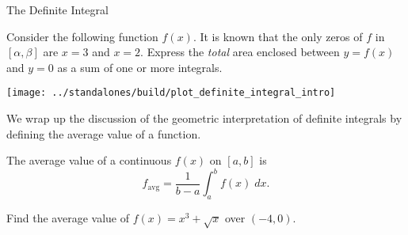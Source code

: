 \documentclass[../main.tex]{subfiles}
\begin{document}
\begin{lesson}{The Definite Integral}
  \begin{example}
    Consider the following function \(f(x)\).  It is known that the only zeros of \(f\) in \([\alpha, \beta]\) are \(x = 3\) and \(x = 2\). Express the \emph{total} area enclosed between \(y = f(x)\) and \(y = 0\) as a sum of one or more integrals.

    \texttt{[image: ../standalones/build/plot\_definite\_integral\_intro]}

  \end{example}
  \clearpage


  We wrap up the discussion of the geometric interpretation of definite integrals by defining the average value of a function. 

  The average value of a continuous \(f(x)\) on \([a,b]\) is
  \[
    f_{\text{avg}} = \frac{1}{b-a} \int_{a}^{b} f(x) \;dx.
  \]

  \begin{example}
    Find the average value of \(f(x) = x^{3} + \sqrt{x}\) over \((-4,0)\).

  \end{example}
\end{lesson}
\end{document}
